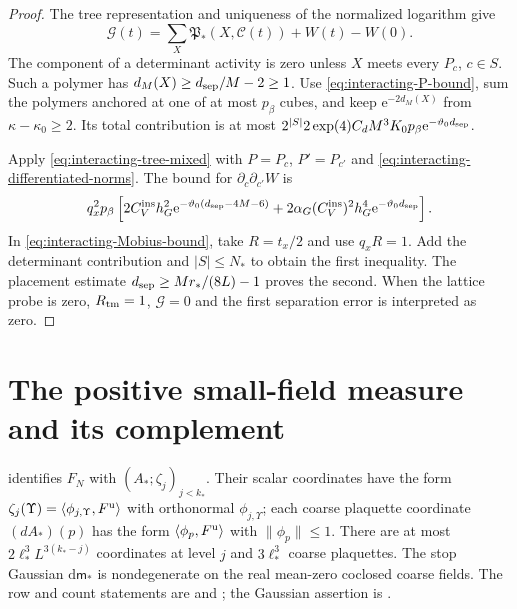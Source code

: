 \documentclass[11pt,letterpaper,reqno]{amsart}
\newcommand{\dd}{\mathrm d}
\begin{document}
\begin{proof}
The tree representation and uniqueness of the
normalized logarithm give
\[
 \mathcal G(t)=\sum_X\mathfrak P_*(X,\mathscr C(t))+W(t)-W(0).
\]
The component of a determinant activity is zero
unless $X$ meets every $P_c$, $c\in S$.
Such a polymer has
$d_M(X)\ge d_{\rm sep}/M-2\ge1$.
Use \eqref{eq:interacting-P-bound}, sum the
polymers anchored at one of at most $p_\beta$
cubes, and keep $\mathrm e^{-2d_M(X)}$ from
$\kappa-\kappa_0\ge2$.
Its total contribution is at most
$2^{|S|}2\exp(4)C_dM^3K_0p_\beta
\mathrm e^{-\vartheta_0d_{\rm sep}}$.

Apply \eqref{eq:interacting-tree-mixed}
with $P=P_c$, $P'=P_{c'}$ and
\eqref{eq:interacting-differentiated-norms}.
The bound for $\partial_c\partial_{c'}W$ is
\[
 q_x^2p_\beta\left[
       2C_V^{\mathrm{ins}}h_G^2\mathrm e^{-\vartheta_0(d_{\rm sep}-4M-6)}
           +2\alpha_G(C_V^{\mathrm{ins}})^2h_G^4\mathrm e^{-\vartheta_0d_{\rm sep}}\right].
\]
In \eqref{eq:interacting-Mobius-bound}, take
$R=t_x/2$ and use $q_xR=1$.
Add the determinant contribution and
$|S|\le N_*$ to obtain the first inequality.
The placement estimate
$d_{\rm sep}\ge Mr_*/(8L)-1$
proves the second.
When the lattice probe is zero,
$R_{\rm tm}=1$, $\mathcal G=0$ and the
first separation error is interpreted as zero.
\end{proof}

\section{The positive small-field measure and its complement}
\label{subsec:interacting-complement}

\cite[Proposition~3.1]{TerminalPressure} identifies $F_N$
with $(A_*;\zeta_j)_{j<k_*}$. Their scalar
coordinates have the form
$\zeta_j(\Upsilon)=\langle\phi_{j,\Upsilon},F^{\rm u}\rangle$
with orthonormal $\phi_{j,\Upsilon}$; each
coarse plaquette coordinate $(dA_*)(p)$ has
the form $\langle\phi_p,F^{\rm u}\rangle$ with
$\|\phi_p\|\le1$.
There are at most $2\ell_*^3L^{3(k_*-j)}$
coordinates at level $j$ and $3\ell_*^3$
coarse plaquettes. The stop Gaussian
$\dd\mathsf m_*$ is nondegenerate on the
real mean-zero coclosed coarse fields.
The row and count statements are
\cite[(13)]{TerminalPressure} and
\cite[(14)]{TerminalPressure}; the
Gaussian assertion is \cite[(12)]{TerminalPressure}.
\end{document}
